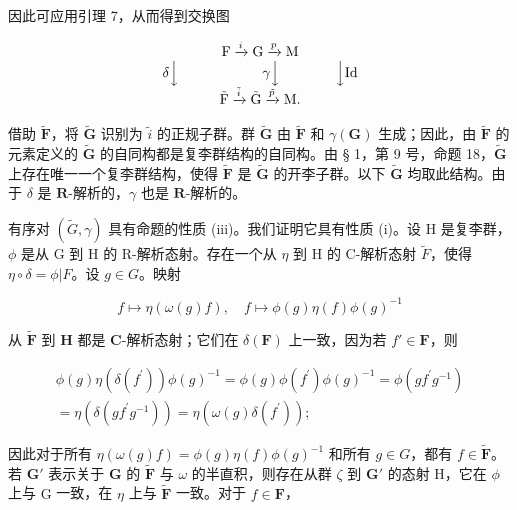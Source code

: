 因此可应用引理 7，从而得到交换图

\[
\begin{array}{c} \mathrm{F} \xrightarrow {i} \mathrm{G} \xrightarrow {p} \mathrm{M} \\ \delta \Big \downarrow \qquad \qquad \qquad \gamma \Big \downarrow \qquad \qquad \Big \downarrow \mathrm{Id} \\ \tilde {\mathrm{F}} \xrightarrow {\tilde {i}} \tilde {\mathrm{G}} \xrightarrow {\tilde {p}} \mathrm{M}. \end{array}
\]

借助 \(\tilde{\mathbf{F}}\)，将 \(\tilde{\mathbf{G}}\) 识别为 \(\tilde{i}\) 的正规子群。群 \(\tilde{\mathbf{G}}\) 由 \(\tilde{\mathbf{F}}\) 和 \(\gamma (\mathbf{G})\) 生成；因此，由 \(\tilde{\mathbf{F}}\) 的元素定义的 \(\tilde{\mathbf{G}}\) 的自同构都是复李群结构的自同构。由 § 1，第 9 号，命题 18，\(\tilde{\mathbf{G}}\) 上存在唯一一个复李群结构，使得 \(\tilde{\mathbf{F}}\) 是 \(\tilde{\mathbf{G}}\) 的开李子群。以下 \(\tilde{\mathbf{G}}\) 均取此结构。由于 \(\delta\) 是 \(\mathbf{R}\)-解析的，\(\gamma\) 也是 \(\mathbf{R}\)-解析的。

有序对 \((\tilde{G},\gamma)\) 具有命题的性质 (iii)。我们证明它具有性质 (i)。设 H 是复李群，\(\phi\) 是从 G 到 H 的 R-解析态射。存在一个从 \(\eta\) 到 H 的 C-解析态射 \(\tilde{F}\)，使得 \(\eta \circ \delta = \phi |F\)。设 \(g\in G\)。映射

\[
f \mapsto \eta (\omega (g) f), \quad f \mapsto \phi (g) \eta (f) \phi (g) ^ {- 1}
\]

从 \(\tilde{\mathbf{F}}\) 到 \(\mathbf{H}\) 都是 \(\mathbf{C}\)-解析态射；它们在 \(\delta(\mathbf{F})\) 上一致，因为若 \(f' \in \mathbf{F}\)，则

\[
\begin{array}{r} \phi (g) \eta (\delta (f ^ {\prime})) \phi (g) ^ {- 1} = \phi (g) \phi (f ^ {\prime}) \phi (g) ^ {- 1} = \phi (g f ^ {\prime} g ^ {- 1}) \\ = \eta (\delta (g f ^ {\prime} g ^ {- 1})) = \eta (\omega (g) \delta (f ^ {\prime})); \end{array}
\]

因此对于所有 \(\eta (\omega (g)f) = \phi (g)\eta (f)\phi (g)^{-1}\) 和所有 \(g\in G\)，都有 \(f\in \tilde{\mathbf{F}}\)。若 \(\mathbf{G}'\) 表示关于 \(\mathbf{G}\) 的 \(\tilde{\mathbf{F}}\) 与 \(\omega\) 的半直积，则存在从群 \(\zeta\) 到 \(\mathbf{G}'\) 的态射 \(\mathrm{H}\)，它在 \(\phi\) 上与 \(\mathrm{G}\) 一致，在 \(\eta\) 上与 \(\tilde{\mathbf{F}}\) 一致。对于 \(f\in \mathbf{F}\)，

